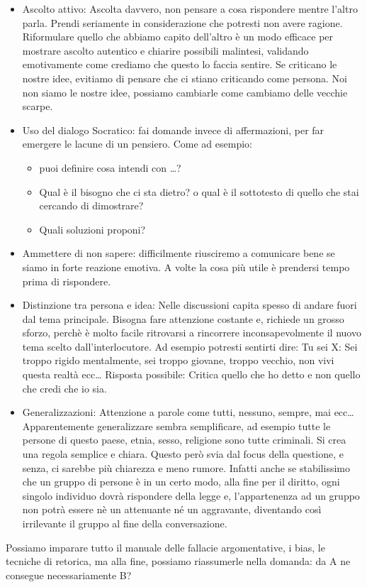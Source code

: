 \documentclass[12pt]{book} %
\begin{document}
\begin{mdframed}[linewidth=1pt]
\begin{itemize} 
\item Ascolto attivo: Ascolta davvero, non pensare a cosa rispondere mentre l'altro parla. Prendi seriamente in considerazione che potresti non avere ragione. 
Riformulare quello che abbiamo capito dell’altro è un modo efficace per mostrare ascolto autentico e chiarire possibili malintesi, validando emotivamente come crediamo che questo lo faccia sentire.
Se criticano le nostre idee, evitiamo di pensare che ci stiano criticando come persona. Noi non siamo le nostre idee, possiamo cambiarle come cambiamo delle vecchie scarpe. 
\item Uso del dialogo Socratico: fai domande invece di affermazioni, per far emergere le lacune di un pensiero. Come ad esempio: 
\begin{itemize}
\item puoi definire cosa intendi con …?
\item Qual è il bisogno che ci sta dietro? o qual è il sottotesto di quello che stai cercando di dimostrare? 
\item Quali soluzioni proponi? 
\end{itemize}
\item Ammettere di non sapere: difficilmente riusciremo a comunicare bene se siamo in forte reazione emotiva. A volte la cosa più utile è prendersi tempo prima di rispondere. 
\item Distinzione tra persona e idea: Nelle discussioni capita spesso di andare fuori dal tema principale. Bisogna fare attenzione costante e, richiede un grosso sforzo, perchè è molto facile ritrovarsi a rincorrere inconsapevolmente il nuovo tema scelto dall'interlocutore. 
Ad esempio potresti sentirti dire: Tu sei X: Sei troppo rigido mentalmente, sei troppo giovane, troppo vecchio, non vivi questa realtà ecc…
Risposta possibile: Critica quello che ho detto e non quello che credi che io sia.
\item Generalizzazioni: Attenzione a parole come tutti, nessuno, sempre, mai ecc… Apparentemente generalizzare sembra semplificare, ad esempio tutte le persone di questo paese, etnia, sesso, religione sono tutte criminali. Si crea una regola semplice e chiara. Questo però svia dal focus della questione, e senza, ci sarebbe più chiarezza e meno rumore. Infatti anche se stabilissimo che un gruppo di persone è in un certo modo, alla fine per il diritto, ogni singolo individuo dovrà rispondere della legge e, l'appartenenza ad un gruppo non potrà essere nè un attenuante né un aggravante, diventando così irrilevante il gruppo al fine della conversazione.
\end{itemize}

Possiamo imparare tutto il manuale delle fallacie argomentative, i bias, le tecniche di retorica, ma alla fine, possiamo riassumerle nella domanda: da A ne consegue necessariamente B?
\end{mdframed}
\end{document}
